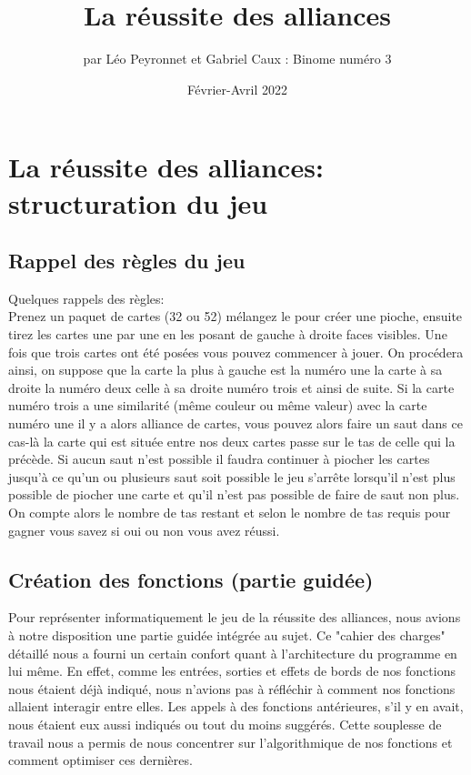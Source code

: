\documentclass[10pt,a4paper,french,titlepage]{article}
\author{par Léo Peyronnet et Gabriel Caux : Binome numéro 3}
\title{La réussite des alliances}
\date{Février-Avril 2022}
\theoremstyle{definition}
\begin{document}
\maketitle
\tableofcontents
\section{La réussite des alliances: structuration du jeu}
\subsection{Rappel des règles du jeu}
Quelques rappels des règles: \\
Prenez un paquet de cartes (32 ou 52) mélangez le pour créer une pioche, ensuite tirez les cartes une par une en les posant de gauche à droite faces visibles. Une fois que trois cartes ont été posées vous pouvez commencer à jouer. On procédera ainsi, on suppose que la carte la plus à gauche est la numéro une la carte à sa droite la numéro deux celle à sa droite numéro trois et ainsi de suite. Si la carte numéro trois a une similarité (même couleur ou même valeur) avec la carte numéro une il y a alors alliance de cartes, vous pouvez alors faire un saut dans ce cas-là la carte qui est située entre nos deux cartes passe sur le tas de celle qui la précède. Si aucun saut n'est possible il faudra continuer à piocher les cartes jusqu'à ce qu'un ou plusieurs saut soit possible le jeu s'arrête lorsqu'il n'est plus possible de piocher une carte et qu'il n'est pas possible de faire de saut non plus. On compte alors le nombre de tas restant et selon le nombre de tas requis pour gagner vous savez si oui ou non vous avez réussi.

\subsection{Création des fonctions (partie guidée)}
Pour représenter informatiquement le jeu de la réussite des alliances, nous avions à notre disposition une partie guidée intégrée au sujet. Ce "cahier des charges" détaillé nous a fourni un certain confort quant à l'architecture du programme en lui même. En effet, comme les entrées, sorties et effets de bords de nos fonctions nous étaient déjà indiqué, nous n'avions pas à réfléchir à comment nos fonctions allaient interagir entre elles. Les appels à des fonctions antérieures, s'il y en avait, nous étaient eux aussi indiqués ou tout du moins suggérés. Cette souplesse de travail nous a permis de nous concentrer sur l'algorithmique de nos fonctions et comment optimiser ces dernières.
\end{document}
